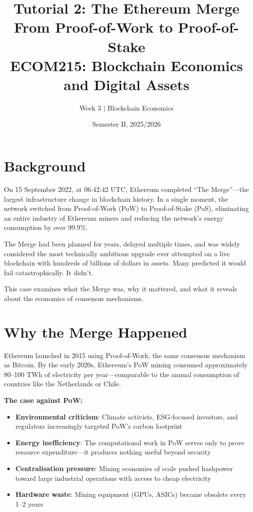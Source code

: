 \documentclass[11pt]{article}
\title{Tutorial 2: The Ethereum Merge\\[0.3em] \Large From Proof-of-Work to Proof-of-Stake\\[1em] \normalsize ECOM215: Blockchain Economics and Digital Assets}
\author{Week 3 $\vert$ Blockchain Economics}
\date{Semester B, 2025/2026}
\begin{document}
\maketitle

\vspace{1em}
\begin{center}
\end{center}

\section*{Background}

On 15 September 2022, at 06:42:42 UTC, Ethereum completed ``The Merge''---the largest infrastructure change in blockchain history. In a single moment, the network switched from Proof-of-Work (PoW) to Proof-of-Stake (PoS), eliminating an entire industry of Ethereum miners and reducing the network's energy consumption by over 99.9\%.

The Merge had been planned for years, delayed multiple times, and was widely considered the most technically ambitious upgrade ever attempted on a live blockchain with hundreds of billions of dollars in assets. Many predicted it would fail catastrophically. It didn't.

This case examines what the Merge was, why it mattered, and what it reveals about the economics of consensus mechanisms.

\section*{Why the Merge Happened}

Ethereum launched in 2015 using Proof-of-Work, the same consensus mechanism as Bitcoin. By the early 2020s, Ethereum's PoW mining consumed approximately 80--100 TWh of electricity per year---comparable to the annual consumption of countries like the Netherlands or Chile.

\medskip
\noindent\textbf{The case against PoW:}
\begin{itemize}[leftmargin=*]
\item \textbf{Environmental criticism}: Climate activists, ESG-focused investors, and regulators increasingly targeted PoW's carbon footprint
\item \textbf{Energy inefficiency}: The computational work in PoW serves only to prove resource expenditure---it produces nothing useful beyond security
\item \textbf{Centralisation pressure}: Mining economies of scale pushed hashpower toward large industrial operations with access to cheap electricity
\item \textbf{Hardware waste}: Mining equipment (GPUs, ASICs) became obsolete every 1--2 years
\end{itemize}
\end{document}
